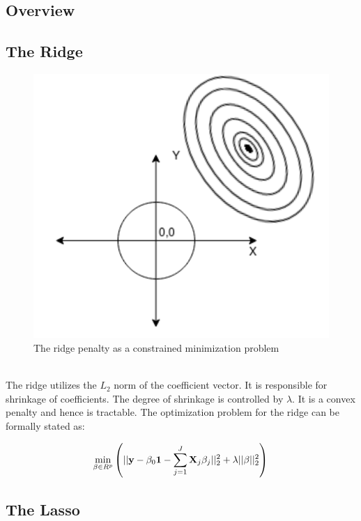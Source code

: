 \documentclass[a4paper,12pt]{article}
\def\bX {{\bf X}}
\def\by{{\bf y}}
\def\bone{{\bf 1}}
\begin{document}
\subsection{Overview}
\subsection{The Ridge}
\begin{figure}[H]
    \centering
    \includegraphics[scale=0.4]{ridge.png}
    \caption{The ridge penalty as a constrained minimization problem}
    \label{fig:ALAMO Flowchart}
\end{figure}
\\
The ridge utilizes the $L_2$ norm of the coefficient vector. It is responsible for shrinkage of coefficients. The degree of shrinkage is controlled by $\lambda$. It is a convex penalty and hence is tractable. The optimization problem for the ridge can be formally stated as:

\begin{eqnarray}
\label{eq:6}
\min_{\beta\in R^p}\left(||\by-\beta_0\bone-\sum_{j=1}^J
\bX_j\beta_j||_2^2 + \lambda ||\beta||_2^2 \right)
\end{eqnarray}



\newpage
\subsection{The Lasso}
\end{document}

